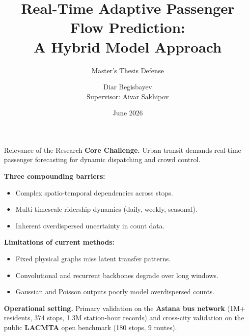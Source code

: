 \documentclass[aspectratio=169, 11pt]{beamer}
\title{Real-Time Adaptive Passenger Flow Prediction:\\A Hybrid Model Approach}
\subtitle{Master's Thesis Defense}
\author{Diar Begisbayev\\[0.3em]{\small Supervisor: Aivar Sakhipov}}
\institute{School of Computer Science and Engineering\\Astana IT University}
\date{June 2026}
\begin{document}

\begin{frame}[plain]
  \titlepage
\end{frame}

\begin{frame}{Relevance of the Research}
\vspace{0.2em}
\small
\textbf{Core Challenge.} Urban transit demands \textcolor{accent}{real-time passenger forecasting} for dynamic dispatching and crowd control.

\vspace{0.5em}
\textbf{Three compounding barriers:}
\begin{itemize}\setlength{\itemsep}{0.15em}
  \item Complex \textcolor{accent}{spatio-temporal dependencies} across stops.
  \item \textcolor{accent}{Multi-timescale} ridership dynamics (daily, weekly, seasonal).
  \item Inherent \textcolor{accent}{overdispersed uncertainty} in count data.
\end{itemize}

\vspace{0.5em}
\textbf{Limitations of current methods:}
\begin{itemize}\setlength{\itemsep}{0.15em}
  \item Fixed physical graphs miss latent transfer patterns.
  \item Convolutional and recurrent backbones degrade over long windows.
  \item Gaussian and Poisson outputs poorly model overdispersed counts.
\end{itemize}

\vspace{0.5em}
\textbf{Operational setting.} Primary validation on the \textbf{Astana bus network} (1M+ residents, 374 stops, 1.3M station-hour records) and cross-city validation on the public \textbf{LACMTA} open benchmark (180 stops, 9 routes).
\end{frame}
\end{document}
